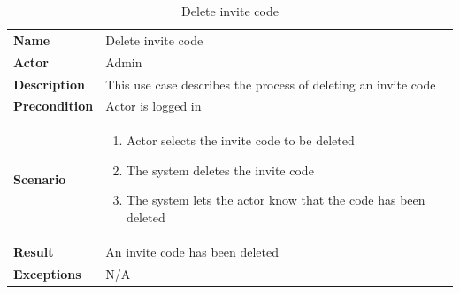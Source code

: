 \begin{table}[ht]
    \caption{Delete invite code}
    \begin{tabular}{|L{5cm}|L{10cm}|}
        \toprule
        \textbf{Name}         & Delete invite code      \\
        \textbf{Actor}        & Admin              \\
        \textbf{Description} & This use case describes the process of deleting an invite code  \\
        \textbf{Precondition} & Actor is logged in \\
        \textbf{Scenario} &
        \vspace{-0.75cm}
        \begin{enumerate}
            \setlength\itemsep{-0.5em}
            \item Actor selects the invite code to be deleted
            \item The system deletes the invite code
            \item The system lets the actor know that the code has been deleted
        \end{enumerate} \\[-0.5cm]
        \textbf{Result} &  An invite code has been deleted \\
        \textbf{Exceptions}   & N/A                \\
        \bottomrule
    \end{tabular}
    \label{tab:table38}
\end{table}
